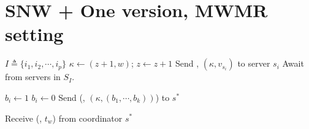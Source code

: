 \section{SNW + One version, MWMR setting}
\label{app:algrithmB}
\begin{algorithm*}[!ht]
  \begin{algorithmic}[2]
  
    \begin{multicols}{3}{\footnotesize
          \EndPart
          \State $I\triangleq \{i_1, i_2, \cdots, i_p \}$
        \Part{ \underline{\writeValue}} {
                \State ${\kappa} \leftarrow (z +1,  w)$; $z \leftarrow z +1 $
            \State Send \writeValueTag, $({\kappa}, v_{s_i})$ to server $s_i$
           \EndFor 
          \State  Await {\ackTag} from servers in  $S_I$.
        }\EndPart
        \Statex
            \Part{ \underline{\informSerializer}} {

             \State $b_i \leftarrow 1$
             \Else
               \State $b_i \leftarrow 0$
            \EndIf
           \EndFor 
                                            \State  Send  (\informSerializerTag, $({\kappa}, (b_{1}, \cdots, b_{k}))$) to   $s^*$

          \State Receive ({\ackTag}, $t_w$) from  coordinator $s^*$
        }\EndPart
      }\end{multicols}
  

\end{algorithmic}
\end{algorithm*}
